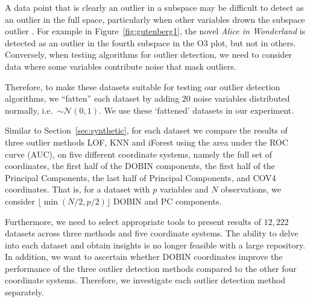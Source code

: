 \documentclass[letter,12pt]{article}
\begin{document}

A data point that is clearly an outlier in a subspace may be difficult to detect as an outlier in the full space, particularly when other variables drown the subspace outlier \citep{zimek2012survey}. For example in Figure~\ref{fig:gutenberg1}, the novel \textit{Alice in Wonderland} is detected as an outlier in the fourth subspace in the O3 plot, but not in others.  Conversely, when testing algorithms for outlier detection, we need to consider data where some variables contribute noise that mask outliers.

Therefore, to make these datasets suitable for testing our outlier detection algorithms, we ``fatten'' each dataset by adding $20$ noise variables distributed normally, i.e.\ $\sim \mathcal{N}(0,1)$. We use these `fattened' datasets in our experiment.

Similar to Section~\ref{sec:synthetic}, for each dataset we compare the results of three outlier methods LOF, KNN and iForest using the area under the ROC curve (AUC), on {\color{blue} five} different coordinate systems, namely the full set of coordinates, the first half of the DOBIN components, the first half of the Principal Components, {\color{blue} the last half of Principal Components, and COV4 coordinates}. That is, for a dataset with $p$ variables and $N$ observations,  we consider $\lfloor\min(N/2, p/2)\rfloor$ DOBIN and PC components.

Furthermore, we need to select appropriate tools to present results of $12,222$ datasets across three methods and {\color{blue}five} coordinate systems. The ability to delve into each dataset and obtain insights is no longer feasible with a large repository. In addition, we want to ascertain whether DOBIN coordinates improve the performance of the three outlier detection methods compared to the other {\color{blue}four} coordinate systems. Therefore, we investigate each outlier detection method separately. 
\end{document}
